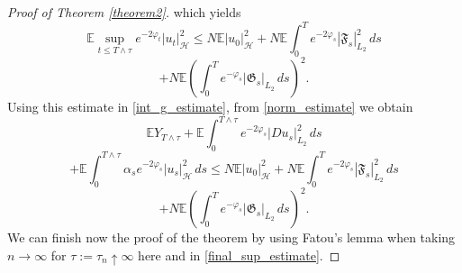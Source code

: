 \documentclass[11pt,reqno]{amsart}
\theoremstyle{definition}
\theoremstyle{remark}
\newcommand\frF{\mathfrak{F}}
\newcommand{\<}{\langle}
\renewcommand{\>}{\rangle}
\newcommand{\E}{\mathbb{E}}
\begin{document}
\begin{proof}[Proof of Theorem \ref{theorem2}]
which yields  
$$
\E\sup_{t\le T\wedge\tau}
e^{-2\varphi_t}|u_t|_{\mathcal H}^2
\le
N\E|u_0|_{\mathcal H}^2
+
N \E\int_0^{T}
e^{-2\varphi_s}|\mathfrak {F}_s|_{L_2}^2\,ds
$$
\begin{equation}
                                 \label{final_sup_estimate}
+N \E\left(\int_0^{T}
e^{-\varphi_s}|\mathfrak {G}_s|_{L_2}\,ds
\right)^2.
\end{equation}
Using this estimate 
in \eqref{int_g_estimate}, from \eqref{norm_estimate} 
we obtain 
$$
\E Y_{T\wedge\tau}+\E\int_0^{T\wedge\tau}
e^{-2\varphi_s}|Du_s|_{L_2}^2\,ds
$$
$$
+
\E\int_0^{T\wedge\tau}\alpha_s e^{-2\varphi_s}
|u_s|_{\mathcal H}^2\,ds
\leq
N\E|u_0|_{\mathcal H}^2+N\E\int_0^{T}
e^{-2\varphi_s}
|\frF_s|_{L_2}^2\,ds
$$
\begin{equation}
                               \label{final_norm_estimate}
+
N\E
\left(
\int_0^{T}
e^{-\varphi_s}
|\mathfrak {G}_s|_{L_2}\,ds
\right)^2.
\end{equation}
We can finish now the proof of the theorem by using Fatou's lemma 
when taking $n\to\infty$ for $\tau:=\tau_n\uparrow\infty$ 
here and in \eqref{final_sup_estimate}. 
\end{proof}
\end{document}
